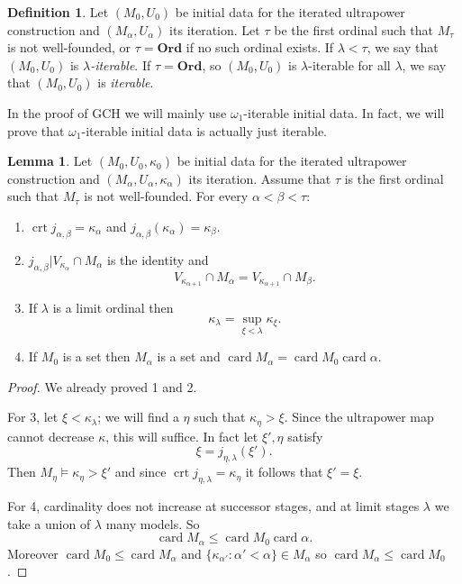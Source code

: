\documentclass[12pt]{report}
\newcommand{\card}{\operatorname{card}}
\newcommand{\Ord}{\mathbf{Ord}}
\DeclareMathOperator{\crt}{crt}
\newcommand{\dfn}[1]{\emph{#1}\index{#1}}
\theoremstyle{definition}
\newtheorem{lemma}[theorem]{Lemma}
\newtheorem{definition}[theorem]{Definition}
\begin{document}
\begin{definition}
Let $(M_0, U_0)$ be initial data for the iterated ultrapower construction and $(M_\alpha, U_\alpha)$ its iteration.
Let $\tau$ be the first ordinal such that $M_\tau$ is not well-founded, or $\tau = \Ord$ if no such ordinal exists.
If $\lambda < \tau$, we say that $(M_0, U_0)$ is \dfn{$\lambda$-iterable}. If $\tau = \Ord$, so $(M_0, U_0)$ is $\lambda$-iterable for all $\lambda$, we say that $(M_0, U_0)$ is \dfn{iterable}.
\end{definition}
In the proof of GCH we will mainly use $\omega_1$-iterable initial data. In fact, we will prove that $\omega_1$-iterable initial data is actually just iterable.

\begin{lemma}
Let $(M_0, U_0, \kappa_0)$ be initial data for the iterated ultrapower construction and $(M_\alpha, U_\alpha, \kappa_\alpha)$ its iteration.
Assume that $\tau$ is the first ordinal such that $M_\tau$ is not well-founded.
For every $\alpha < \beta < \tau$:
\begin{enumerate}
\item $\crt j_{\alpha,\beta} = \kappa_\alpha$ and $j_{\alpha,\beta}(\kappa_\alpha) = \kappa_\beta$.
\item $j_{\alpha,\beta}|V_{\kappa_\alpha}\cap M_\alpha$ is the identity and
$$V_{\kappa_{\alpha + 1}} \cap M_\alpha = V_{\kappa_{\alpha + 1}} \cap M_\beta.$$
\item If $\lambda$ is a limit ordinal then
$$\kappa_\lambda = \sup_{\xi < \lambda} \kappa_\xi.$$
\item If $M_0$ is a set then $M_\alpha$ is a set and $\card M_\alpha = \card M_0 \card \alpha$.
\end{enumerate}
\end{lemma}
\begin{proof}
We already proved 1 and 2.

For 3, let $\xi < \kappa_\lambda$; we will find a $\eta$ such that $\kappa_\eta > \xi$. Since the ultrapower map cannot decrease $\kappa$, this will suffice.
In fact let $\xi',\eta$ satisfy
$$\xi = j_{\eta,\lambda}(\xi').$$
Then $M_\eta \models \kappa_\eta > \xi'$ and since $\crt j_{\eta, \lambda} = \kappa_\eta$ it follows that $\xi' = \xi$.

For 4, cardinality does not increase at successor stages, and at limit stages $\lambda$ we take a union of $\lambda$ many models. So
$$\card M_\alpha \leq \card M_0 \card \alpha.$$
Moreover $\card M_0 \leq \card M_\alpha$ and $\{\kappa_{\alpha'}: \alpha' < \alpha\} \in M_\alpha$ so $\card M_\alpha \leq \card M_0$.
\end{proof}
\end{document}
